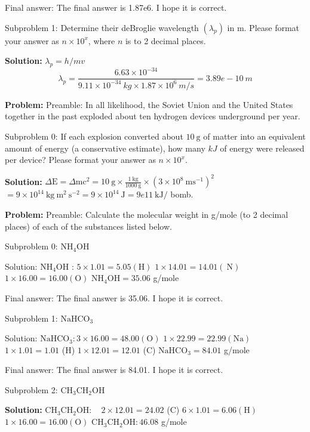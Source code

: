\documentclass[10pt]{article}
\begin{document}
Final answer: The final answer is 1.87e6. I hope it is correct.

Subproblem 1: Determine their deBroglie wavelength $\left(\lambda_{p}\right)$ in m. Please format your answer as $n \times 10^x$, where $n$ is to 2 decimal places. 


\textbf{Solution:}
$\lambda_{p}=h / m v$
\[
\lambda_{p}=\frac{6.63 \times 10^{-34}}{9.11 \times 10^{-34} {~kg} \times 1.87 \times 10^{6} {~m} / {s}}= \boxed{3.89e-10} {~m}
\]


\textbf{Problem:}
Preamble: In all likelihood, the Soviet Union and the United States together in the past exploded about ten hydrogen devices underground per year.

Subproblem 0: If each explosion converted about $10 \mathrm{~g}$ of matter into an equivalent amount of energy (a conservative estimate), how many $k J$ of energy were released per device? Please format your answer as $n \times 10^{x}$. 


\textbf{Solution:}
$\Delta \mathrm{E}=\Delta \mathrm{mc}^{2}=10 \mathrm{~g} \times \frac{1 \mathrm{~kg}}{1000 \mathrm{~g}} \times\left(3 \times 10^{8} \mathrm{~ms}^{-1}\right)^{2}$ $=9 \times 10^{14} \mathrm{~kg} \mathrm{~m}^{2} \mathrm{~s}^{-2}=9 \times 10^{14} \mathrm{~J}= \boxed{9e11} \mathrm{~kJ} /$ bomb.


\textbf{Problem:}
Preamble: Calculate the molecular weight in g/mole (to 2 decimal places) of each of the substances listed below.

Subproblem 0: $\mathrm{NH}_{4} \mathrm{OH}$


Solution: $\mathrm{NH}_{4} \mathrm{OH}$ :
$5 \times 1.01=5.05(\mathrm{H})$
$1 \times 14.01=14.01(\mathrm{~N})$
$1 \times 16.00=16.00(\mathrm{O})$
$\mathrm{NH}_{4} \mathrm{OH}= \boxed{35.06}$ g/mole

Final answer: The final answer is 35.06. I hope it is correct.

Subproblem 1: $\mathrm{NaHCO}_{3}$


Solution: $\mathrm{NaHCO}_{3}: 3 \times 16.00=48.00(\mathrm{O})$
$1 \times 22.99=22.99(\mathrm{Na})$
$1 \times 1.01=1.01$ (H)
$1 \times 12.01=12.01$ (C)
$\mathrm{NaHCO}_{3}= \boxed{84.01}$ g/mole

Final answer: The final answer is 84.01. I hope it is correct.

Subproblem 2: $\mathrm{CH}_{3} \mathrm{CH}_{2} \mathrm{OH}$


\textbf{Solution:}
$\mathrm{CH}_{3} \mathrm{CH}_{2} \mathrm{OH}: \quad 2 \times 12.01=24.02$ (C)
$6 \times 1.01=6.06(\mathrm{H})$
$1 \times 16.00=16.00(\mathrm{O})$
$\mathrm{CH}_{3} \mathrm{CH}_{2} \mathrm{OH}: \boxed{46.08}$ g/mole
\end{document}
